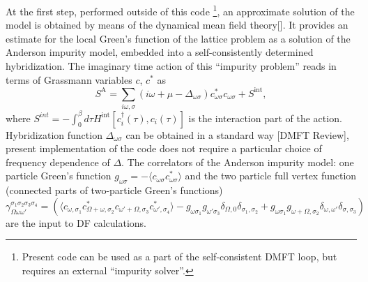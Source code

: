 \documentclass[3p,times,procedia]{elsarticle}
\begin{document}
At the first step, performed outside of this code \footnote{Present code can be used as a part of the self-consistent DMFT loop, but requires an external ``impurity solver''.}, an approximate solution of the model is obtained by means of the dynamical mean field theory[]. 
It provides an estimate for the local Green's function of the lattice problem as a  solution of the Anderson impurity model, embedded into a self-consistently determined hybridization. The imaginary time action of this ``impurity problem''  reads in terms of Grassmann variables $c$, $c^*$ as 
\begin{equation}
S^{\mathrm{A}} = \sum_{i\omega,\sigma} (i\omega + \mu - \Delta_{\omega\sigma}) c^*_{\omega\sigma} c_{\omega\sigma} + S^{\mathrm{int}},
\end{equation}
where $S^{int} = -\int_0^\beta d\tau H^{\mathrm{int}} [c^\dagger_i(\tau), c_i(\tau)] $ is the interaction part of the action. 
Hybridization function $\Delta_{\omega\sigma}$ can be obtained in a standard way [DMFT Review], present implementation of the code does not require a particular choice of frequency dependence of $\Delta$. 
The correlators of the Anderson impurity model: one particle Green's function $g_{\omega\sigma} = -\langle c_{\omega\sigma} c^*_{\omega\sigma} \rangle$ and the two particle full vertex function (connected parts of two-particle Green's functions)  
\begin{equation}
\gamma_{\Omega\omega\omega'}^{\sigma_1\sigma_2\sigma_3\sigma_4} = \left(\langle c_{\omega,\sigma_1} c^*_{\Omega + \omega,\sigma_2} c_{\omega' + \Omega, \sigma_3} c^*_{\omega', \sigma_4}\rangle - g_{\omega\sigma_1}g_{\omega'\sigma_3}\delta_{\Omega,0}\delta_{\sigma_1,\sigma_2} + g_{\omega\sigma_1} g_{\omega + \Omega, \sigma_2} \delta_{\omega,\omega'}\delta_{\sigma, \sigma_3} \right)
\end{equation}
are the input to DF calculations. 
\end{document}
